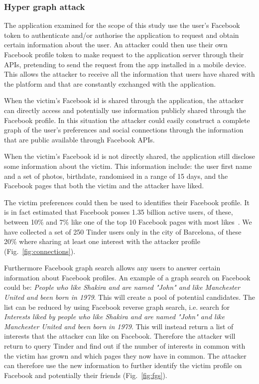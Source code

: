 \subsubsection{Hyper graph attack}

The application examined for the scope of this study use the user's Facebook token to authenticate and/or authorise the application to request and obtain certain information about the user.
An attacker could then use their own Facebook profile token to make request to the application server through their APIs, pretending to send the request from the app installed in a mobile device. This allows the attacker to receive all the information that users have shared with the platform and that are constantly exchanged with the application.

When the victim's Facebook id is shared through the application, the attacker can directly access and potentially use information publicly shared through the Facebook profile. In this situation the attacker could easily construct a complete graph of the user's preferences and social connections through the information that are public available through Facebook APIs.

When the victim's Facebook id is not directly shared, the application still disclose some information about the victim. This information include: the user first name and a set of photos, birthdate, randomised in a range of 15 days, and the Facebook pages that both the victim and the attacker have liked.

The victim preferences could then be used to identifies their Facebook profile. It is in fact estimated that Facebook posses 1.35 billion active users, of these, between 10\% and 7\% like one of the top 10 Facebook pages with most likes~\cite{pagedata}. We have collected a set of 250 Tinder users only in the city of Barcelona, of these 20\% where sharing at least one interest with the attacker profile (Fig.~\ref{fig:connections}).

Furthermore Facebook graph search allows any users to answer certain information about Facebook profiles. An example of a graph search on Facebook could be: \emph{People who like Shakira and are named "John" and like Manchester United and been born in 1979}. This will create a pool of potential candidates. The list can be reduced by using Facebook reverse graph search, i.e. search for \emph{Interests liked by people who like Shakira and are named "John" and like Manchester United and been born in 1979}.  This will instead return a list of interests that the attacker can like on Facebook. Therefore the attacker will return to query Tinder and find out if the number of interests in common with the victim has grown and which pages they now have in common. The attacker can therefore use the new information to further identify the victim profile on Facebook and potentially their friends (Fig.~\ref{fig:fgs}).

